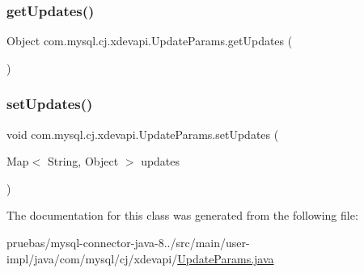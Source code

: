 \mbox{\label{classcom_1_1mysql_1_1cj_1_1xdevapi_1_1_update_params_a57dc42d6ed345654f4bcb7769fe584dc}} 
\subsubsection{\texorpdfstring{get\+Updates()}{getUpdates()}}
{\footnotesize\ttfamily Object com.\+mysql.\+cj.\+xdevapi.\+Update\+Params.\+get\+Updates (\begin{DoxyParamCaption}{ }\end{DoxyParamCaption})}

\mbox{\label{classcom_1_1mysql_1_1cj_1_1xdevapi_1_1_update_params_a10b7500218727edfcb8299e07183b2e1}} 
\subsubsection{\texorpdfstring{set\+Updates()}{setUpdates()}}
{\footnotesize\ttfamily void com.\+mysql.\+cj.\+xdevapi.\+Update\+Params.\+set\+Updates (\begin{DoxyParamCaption}\item[{Map$<$ String, Object $>$}]{updates }\end{DoxyParamCaption})}



The documentation for this class was generated from the following file\+:\begin{DoxyCompactItemize}
\item 
pruebas/mysql-\/connector-\/java-\/8../src/main/user-\/impl/java/com/mysql/cj/xdevapi/\mbox{\hyperlink{_update_params_8java}{Update\+Params.\+java}}\end{DoxyCompactItemize}
